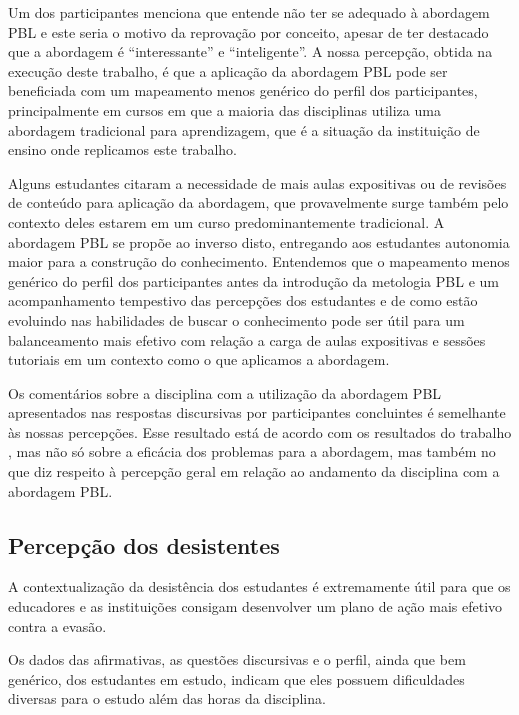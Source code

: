 Um dos participantes menciona que entende não ter se adequado
à abordagem \ac{PBL} e este seria o motivo da reprovação por conceito,
apesar de ter destacado que a abordagem é ``interessante'' e ``inteligente''.
A nossa percepção, obtida na execução deste trabalho, é que a aplicação
da abordagem \ac{PBL} pode ser beneficiada com um mapeamento menos genérico
do perfil dos participantes, principalmente em cursos em que a maioria
das disciplinas utiliza uma abordagem tradicional para aprendizagem, que
é a situação da instituição de ensino onde replicamos este trabalho.

Alguns estudantes citaram a necessidade de mais aulas
expositivas ou de revisões de conteúdo para aplicação
da abordagem, que provavelmente surge também pelo
contexto deles estarem em um curso
predominantemente tradicional.
A abordagem \ac{PBL} se propõe ao inverso disto, entregando
aos estudantes autonomia maior para a construção
do conhecimento.
Entendemos que o mapeamento menos genérico do perfil
dos participantes antes da introdução da metologia \ac{PBL}
e um acompanhamento tempestivo das percepções dos estudantes
e de como estão evoluindo nas habilidades de buscar o conhecimento
pode ser útil para um balanceamento mais efetivo com
relação a carga de aulas expositivas e sessões tutoriais
em um contexto como o que aplicamos a abordagem.

Os comentários sobre a disciplina com a utilização da abordagem \ac{PBL}
apresentados nas respostas discursivas por participantes concluintes
é semelhante às nossas percepções.
Esse resultado está de acordo com os resultados do
trabalho , mas não só sobre a eficácia
dos problemas para a abordagem, mas também no que diz respeito
à percepção geral em relação ao andamento da disciplina
com a abordagem \ac{PBL}.

\subsection{Percepção dos desistentes}

A contextualização da desistência dos estudantes é extremamente útil
para que os educadores e as instituições consigam desenvolver um
plano de ação mais efetivo contra a evasão.

Os dados das afirmativas, as questões discursivas e o perfil,
ainda que bem genérico, dos estudantes em estudo, indicam que
eles possuem dificuldades diversas para o estudo além
das horas da disciplina.

